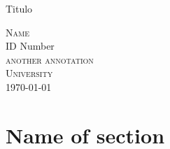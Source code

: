 \documentclass[a4paper, 11pt]{article}
\begin{document}
	

\begingroup
    \begin{titlepage}
        \begin{minipage}{\textwidth}
            \vspace{2cm}
            \noindent
            \begin{center}
                {\fontsize{40}{50}\selectfont Titulo\\[0.5\baselineskip]}
            \end{center}
            \vspace{35mm}
            \begin{flushright}
                {\Large \textsc{Name}} \\[0.2\baselineskip]
                {\large ID Number} \\[0.2\baselineskip] 
                \textsc{another annotation} \\[6.1\baselineskip]
                \textsc{University} \\[0.2\baselineskip]
                \today \\[0\baselineskip]
            \end{flushright}
        \end{minipage}
    \end{titlepage}
\endgroup



\section*{Name of section}



\end{document}
